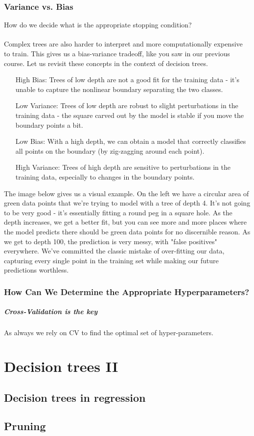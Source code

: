 \documentclass[11pt,a4paper]{report}
\begin{document}
\subsection{Variance vs. Bias}
How do we decide what is the appropriate stopping condition?\\\\
Complex trees are also harder to interpret and more computationally expensive to train. This gives us a bias-variance tradeoff, like you saw in our previous course. Let us revisit these concepts in the context of decision trees.
\begin{itemize}
\item[High Bias:]Trees of low depth are not a good fit for the training data - it’s unable to capture the nonlinear boundary separating the two classes.
\item[Low Variance:]Trees of low depth are robust to slight perturbations in the training data - the square carved out by the model is stable if you move the boundary points a bit.
\item[Low Bias:] With a high depth, we can obtain a model that correctly classifies all points on the boundary (by zig-zagging around each point).
\item[High Variance:]Trees of high depth are sensitive to perturbations in the training data, especially to changes in the boundary points.
\end{itemize}
The image below gives us a visual example. On the left we have a circular area of green data points that we're trying to model with a tree of depth 4. It's not going to be very good - it's essentially fitting a round peg in a square hole. As the depth increases, we get a better fit, but you can see more and more places where the model predicts there should be green data points for no discernible reason. As we get to depth 100, the prediction is very messy, with "false positives" everywhere. We've committed the classic mistake of over-fitting our data, capturing every single point in the training set while making our future predictions worthless.\\
\subsection*{How Can We Determine the Appropriate Hyperparameters?}
\paragraph{Cross-Validation is the key} As always we rely on CV to find the optimal set of hyper-parameters.
\pagebreak
\chapter{Decision trees II}
\section{Decision trees in regression}
\section{Pruning}
\end{document}
